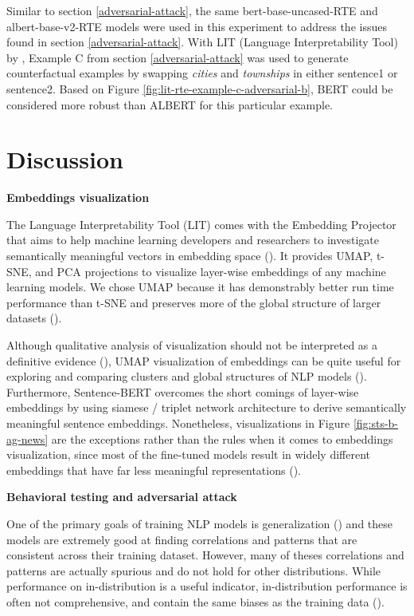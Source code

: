 \documentclass{article}
\begin{document}
\clearpage

Similar to section \ref{adversarial-attack}, the same bert-base-uncased-RTE and albert-base-v2-RTE models were used in this experiment to address the issues found in section \ref{adversarial-attack}. With LIT (Language Interpretability Tool) by \citet{Tenney2020TheLI}, Example C from section \ref{adversarial-attack} was used to generate counterfactual examples by swapping \emph{cities} and \emph{townships} in either sentence1 or sentence2. Based on Figure \ref{fig:lit-rte-example-c-adversarial-b}, BERT could be considered more robust than ALBERT for this particular example.

\section{Discussion}

\textbf{Embeddings visualization}

The Language Interpretability Tool (LIT) comes with the Embedding Projector that aims to help machine learning developers and researchers to investigate semantically meaningful vectors in embedding space (\citet{Tenney2020TheLI}). It provides UMAP, t-SNE, and PCA projections to visualize layer-wise embeddings of any machine learning models. We chose UMAP because it has demonstrably better run time performance than t-SNE and preserves more of the global structure of larger datasets (\citet{McInnes2018UMAPUM}).

Although qualitative analysis of visualization should not be interpreted as a definitive evidence (\citet{Rogers2020API}), UMAP visualization of embeddings can be quite useful for exploring and comparing clusters and global structures of NLP models (\citet{Tenney2020TheLI}). Furthermore, Sentence-BERT overcomes the short comings of layer-wise embeddings by using siamese / triplet network architecture to derive semantically meaningful sentence embeddings. Nonetheless, visualizations in Figure \ref{fig:sts-b-ag-news} are the exceptions rather than the rules when it comes to embeddings visualization, since most of the fine-tuned models result in widely different embeddings that have far less meaningful representations (\citet{reimers-gurevych-2019-sentence}).

\textbf{Behavioral testing and adversarial attack}

One of the primary goals of training NLP models is generalization (\citet{Morris2020TextAttackAF}) and these models are extremely good at finding correlations and patterns that are consistent across their training dataset. However, many of theses correlations and patterns are actually spurious and do not hold for other distributions. While performance on in-distribution is a useful indicator, in-distribution performance is often not comprehensive, and contain the same biases as the training data (\citet{Ribeiro2020BeyondAB}).
\end{document}
